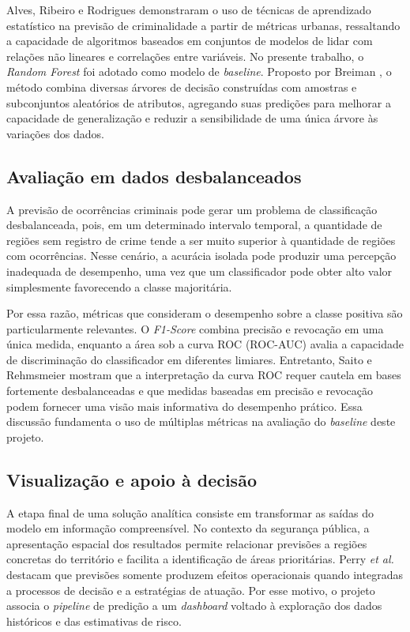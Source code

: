 \documentclass[12pt]{article}
\begin{document}
Alves, Ribeiro e Rodrigues \cite{alves2018} demonstraram o uso de técnicas de aprendizado estatístico na previsão de criminalidade a partir de métricas urbanas, ressaltando a capacidade de algoritmos baseados em conjuntos de modelos de lidar com relações não lineares e correlações entre variáveis. No presente trabalho, o \textit{Random Forest} foi adotado como modelo de \textit{baseline}. Proposto por Breiman \cite{breiman2001}, o método combina diversas árvores de decisão construídas com amostras e subconjuntos aleatórios de atributos, agregando suas predições para melhorar a capacidade de generalização e reduzir a sensibilidade de uma única árvore às variações dos dados.

\subsection{Avaliação em dados desbalanceados}
A previsão de ocorrências criminais pode gerar um problema de classificação desbalanceada, pois, em um determinado intervalo temporal, a quantidade de regiões sem registro de crime tende a ser muito superior à quantidade de regiões com ocorrências. Nesse cenário, a acurácia isolada pode produzir uma percepção inadequada de desempenho, uma vez que um classificador pode obter alto valor simplesmente favorecendo a classe majoritária.

Por essa razão, métricas que consideram o desempenho sobre a classe positiva são particularmente relevantes. O \textit{F1-Score} combina precisão e revocação em uma única medida, enquanto a área sob a curva ROC (ROC-AUC) avalia a capacidade de discriminação do classificador em diferentes limiares. Entretanto, Saito e Rehmsmeier \cite{saito2015} mostram que a interpretação da curva ROC requer cautela em bases fortemente desbalanceadas e que medidas baseadas em precisão e revocação podem fornecer uma visão mais informativa do desempenho prático. Essa discussão fundamenta o uso de múltiplas métricas na avaliação do \textit{baseline} deste projeto.

\subsection{Visualização e apoio à decisão}
A etapa final de uma solução analítica consiste em transformar as saídas do modelo em informação compreensível. No contexto da segurança pública, a apresentação espacial dos resultados permite relacionar previsões a regiões concretas do território e facilita a identificação de áreas prioritárias. Perry \textit{et al.} \cite{perry2013} destacam que previsões somente produzem efeitos operacionais quando integradas a processos de decisão e a estratégias de atuação. Por esse motivo, o projeto associa o \textit{pipeline} de predição a um \textit{dashboard} voltado à exploração dos dados históricos e das estimativas de risco.
\end{document}
